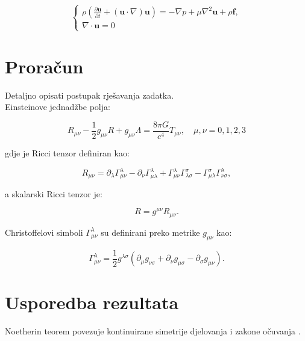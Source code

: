 \documentclass[a4paper,12pt]{article}
\begin{document}
\begin{equation}
\begin{cases}
\rho \left( \frac{\partial \mathbf{u}}{\partial t} + (\mathbf{u} \cdot \nabla) \mathbf{u} \right) = - \nabla p + \mu \nabla^2 \mathbf{u} + \rho \mathbf{f}, \\[0.5em]
\nabla \cdot \mathbf{u} = 0
\end{cases}
\end{equation}


\section{Proračun}
Detaljno opisati postupak rješavanja zadatka.\\

\noindent
Einsteinove jednadžbe polja:

\begin{equation}
R_{\mu\nu} - \frac{1}{2} g_{\mu\nu} R + g_{\mu\nu} \Lambda = \frac{8 \pi G}{c^4} T_{\mu\nu}, \quad \mu,\nu = 0,1,2,3
\end{equation}

\noindent gdje je Ricci tenzor definiran kao:

\begin{equation}
R_{\mu\nu} = \partial_\lambda \Gamma^\lambda_{\mu\nu} - \partial_\nu \Gamma^\lambda_{\mu\lambda} + \Gamma^\lambda_{\mu\nu} \Gamma^\sigma_{\lambda\sigma} - \Gamma^\sigma_{\mu\lambda} \Gamma^\lambda_{\nu\sigma},
\end{equation}

\noindent a skalarski Ricci tenzor je:

\begin{equation}
R = g^{\mu\nu} R_{\mu\nu}.
\end{equation}

\noindent Christoffelovi simboli \(\Gamma^\lambda_{\mu\nu}\) su definirani preko metrike \(g_{\mu\nu}\) kao:

\begin{equation}
\Gamma^\lambda_{\mu\nu} = \frac{1}{2} g^{\lambda\sigma} \left( \partial_\mu g_{\nu\sigma} + \partial_\nu g_{\mu\sigma} - \partial_\sigma g_{\mu\nu} \right).
\end{equation}


\newpage
\section{Usporedba rezultata}
Noetherin teorem povezuje kontinuirane simetrije djelovanja i zakone očuvanja \cite{Noether1918}.\\
\end{document}
